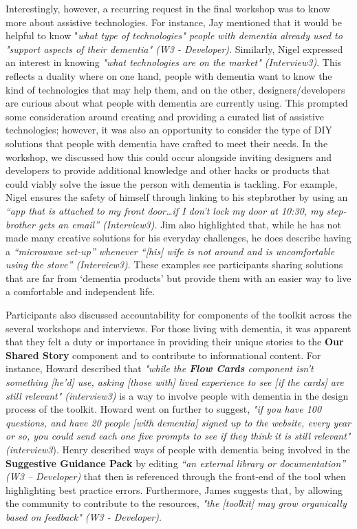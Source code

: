 Interestingly, however, a recurring request in the final workshop was to know more about assistive technologies. For instance, Jay mentioned that it would be helpful to know "\textit{what type of technologies" people with dementia already used to "support aspects of their dementia" (W3 - Developer)}. Similarly, Nigel expressed an interest in knowing \textit{"what technologies are on the market" (Interview3)}. This reflects a duality where on one hand, people with dementia want to know the kind of technologies that may help them, and on the other, designers/developers are curious about what people with dementia are currently using. This prompted some consideration around creating and providing a curated list of assistive technologies; however, it was also an opportunity to consider the type of DIY solutions that people with dementia have crafted to meet their needs. In the workshop, we discussed how this could occur alongside inviting designers and developers to provide additional knowledge and other hacks or products that could viably solve the issue the person with dementia is tackling. For example, Nigel ensures the safety of himself through linking to his stepbrother by using an \textit{“app that is attached to my front door…if I don’t lock my door at 10:30, my step-brother gets an email” (Interview3)}. Jim also highlighted that, while he has not made many creative solutions for his everyday challenges, he does describe having a \textit{“microwave set-up” whenever “[his] wife is not around and is uncomfortable using the stove” (Interview3)}. These examples see participants sharing solutions that are far from ‘dementia products’ but provide them with an easier way to live a comfortable and independent life.

Participants also discussed accountability for components of the toolkit across the several workshops and interviews. For those living with dementia, it was apparent that they felt a duty or importance in providing their unique stories to the \textbf{Our Shared Story} component and to contribute to informational content. For instance, Howard described that \textit{"while the \textbf{Flow Cards} component isn't something [he'd] use, asking [those with] lived experience to see [if the cards] are still relevant" (interview3)} is a way to involve people with dementia in the design process of the toolkit. Howard went on further to suggest, \textit{"if you have 100 questions, and have 20 people [with dementia] signed up to the website, every year or so, you could send each one five prompts to see if they think it is still relevant" (interview3}). Henry described ways of people with dementia being involved in the \textbf{Suggestive Guidance Pack} by editing \textit{“an external library or documentation” (W3 – Developer)} that then is referenced through the front-end of the tool when highlighting best practice errors. Furthermore, James suggests that, by allowing the community to contribute to the resources, \textit{"the [toolkit] may grow organically based on feedback" (W3 - Developer)}. 


